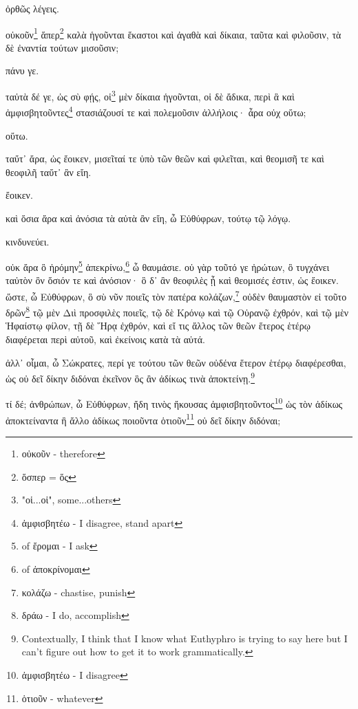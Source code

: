 ὀρθῶς
λέγεις.

οὐκοῦν\footnote{οὐκοῦν - therefore}
ἅπερ\footnote{ὅσπερ = ὅς}
καλὰ
ἡγοῦνται
ἕκαστοι
καὶ
ἀγαθὰ
καὶ
δίκαια,
ταῦτα
καὶ
φιλοῦσιν,
τὰ
δὲ
ἐναντία
τούτων
μισοῦσιν;

πάνυ
γε.

ταὐτὰ
δέ
γε,
ὡς
σὺ
φῄς,
οἱ\footnote{"οἱ...οἱ", some...others}
μὲν
δίκαια
ἡγοῦνται,
\versification{[8a]}
οἱ
δὲ
ἄδικα,
περὶ
ἃ
καὶ
ἀμφισβητοῦντες\footnote{ἀμφισβητέω - I disagree, stand apart}
στασιάζουσί
τε
καὶ
πολεμοῦσιν
ἀλλήλοις·
ἆρα
οὐχ
οὕτω;






οὕτω.

ταὔτ᾽
ἄρα,
ὡς
ἔοικεν,
μισεῖταί
τε
ὑπὸ
τῶν
θεῶν
καὶ
φιλεῖται,
καὶ
θεομισῆ
τε
καὶ
θεοφιλῆ
ταὔτ᾽
ἂν
εἴη.

ἔοικεν.

καὶ
ὅσια
ἄρα
καὶ
ἀνόσια
τὰ
αὐτὰ
ἂν
εἴη,
ὦ
Εὐθύφρων,
τούτῳ
τῷ
λόγῳ.

κινδυνεύει.

οὐκ
ἄρα
ὃ
ἠρόμην\footnote{ of ἔρομαι - I ask}
ἀπεκρίνω,\footnote{ of ἀποκρίνομαι}
ὦ
θαυμάσιε.
οὐ
γὰρ
τοῦτό
γε
ἠρώτων,
ὃ
τυγχάνει
ταὐτὸν
ὂν
ὅσιόν
τε
καὶ
ἀνόσιον·
ὃ
δ᾽
ἂν
θεοφιλὲς
ᾖ
καὶ
θεομισές
ἐστιν,
ὡς
ἔοικεν.
\versification{[8b]}
ὥστε,
ὦ
Εὐθύφρων,
ὃ
σὺ
νῦν
ποιεῖς
τὸν
πατέρα
κολάζων,\footnote{κολάζω - chastise, punish}
οὐδὲν
θαυμαστὸν
εἰ
τοῦτο
δρῶν\footnote{δράω - I do, accomplish}
τῷ
μὲν
Διὶ
προσφιλὲς
ποιεῖς,
τῷ
δὲ
Κρόνῳ
καὶ
τῷ
Οὐρανῷ
ἐχθρόν,
καὶ
τῷ
μὲν
Ἡφαίστῳ
φίλον,
τῇ
δὲ
Ἥρᾳ
ἐχθρόν,
καὶ
εἴ
τις
ἄλλος
τῶν
θεῶν
ἕτερος
ἑτέρῳ
διαφέρεται
περὶ
αὐτοῦ,
καὶ
ἐκείνοις
κατὰ
τὰ
αὐτά.

ἀλλ᾽
οἶμαι,
ὦ
Σώκρατες,
περί
γε
τούτου
τῶν
θεῶν
οὐδένα
ἕτερον
ἑτέρῳ
διαφέρεσθαι,
ὡς
οὐ
δεῖ
δίκην
διδόναι
ἐκεῖνον
ὃς
ἂν
ἀδίκως
τινὰ
ἀποκτείνῃ.\footnote{Contextually, I think that I know what Euthyphro is trying to say here but I can't figure out how to get it to work grammatically.}

τί
δέ;
ἀνθρώπων,
ὦ
Εὐθύφρων,
ἤδη
τινὸς
ἤκουσας
\versification{[8c]}
ἀμφισβητοῦντος\footnote{ἀμφισβητέω - I disagree}
ὡς
τὸν
ἀδίκως
ἀποκτείναντα
ἢ
ἄλλο
ἀδίκως
ποιοῦντα
ὁτιοῦν\footnote{ὁτιοῦν - whatever}
οὐ
δεῖ
δίκην
διδόναι;

